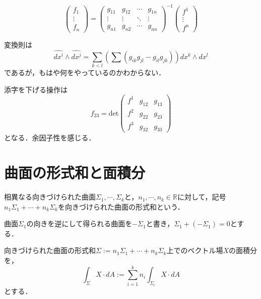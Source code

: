\documentclass[uplatex, dvipdfmx]{jsreport}
\begin{document}
\begin{definition}[ベクトル場の定める1-形式]
    \[ \begin{pmatrix}f_1\\\vdots\\f_n\end{pmatrix} = \begin{pmatrix}g_{11}&g_{12}&\cdots&g_{1n}\\\vdots&\vdots&\ddots&\vdots\\g_{n1}&g_{n2}&\cdots&g_{nn}\end{pmatrix}^{-1}\begin{pmatrix}f^1\\\vdots\\f^n\end{pmatrix} \]
\end{definition}

\begin{definition}[ベクトル場の定める2-形式]
    変換則は
    \[ \widehat{dx^i}\wedge\widehat{dx^j} = \sum_{k<l}\left(\sum (g_{ik}g_{jl}-g_{il}g_{jk})\right)dx^k\wedge dx^l \]
    であるが，もはや何をやっているのかわからない．

    添字を下げる操作は
    \[ f_{23}=\mathrm{det}\begin{pmatrix}f^1&g_{12}&g_{13}\\f^2&g_{22}&g_{23}\\f^3&g_{32}&g_{33}\end{pmatrix} \]
    となる．余因子性を感じる．
\end{definition}

\section{曲面の形式和と面積分}

\begin{definition}[曲面の形式和]
    相異なる向きづけられた曲面$\Sigma_1,\cdots,\Sigma_k$と，$n_1,\cdots,n_k\in\mathbb{R}$に対して，記号$n_1\Sigma_1+\cdots+n_k\Sigma_k$を向きづけられた曲面の形式和という．

    曲面$\Sigma_1$の向きを逆にして得られる曲面を$-\Sigma_1$と書き，$\Sigma_1+(-\Sigma_1)=0$とする．
\end{definition}

\begin{definition}[向きづけられた曲面の形式和上でのベクトル場の面積分]
    向きづけられた曲面の形式和$\Sigma:=n_1\Sigma_1+\cdots+n_k\Sigma_k$上でのベクトル場$X$の面積分を，
    \[ \int_\Sigma X\cdot dA := \sum^k_{i=1}n_i\int_{\Sigma_i}X\cdot dA \]
    とする．
\end{definition}
\end{document}
